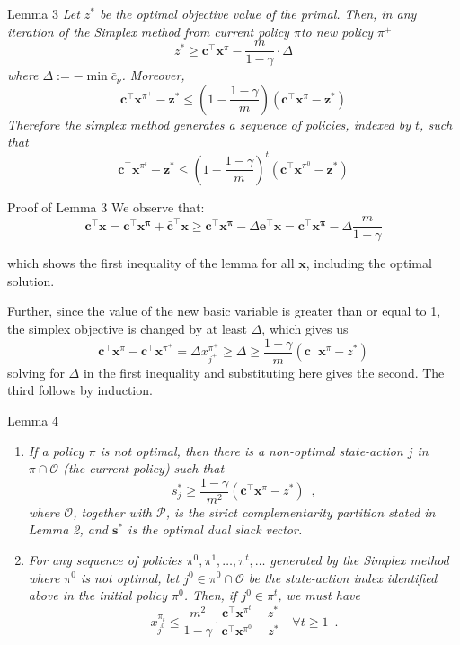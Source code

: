 \documentclass{beamer}
\renewcommand{\vec}[1]{\mathbf{#1}}
\begin{document}
\begin{frame}{Lemma 3}
\emph{Let $z^{\ast}$ be the optimal objective value of the primal. Then, in any iteration of the Simplex method from current policy $\pi$to new policy $\pi^+$
$$z^{\ast} \geq \vec{c}^\top \vec{x}^\pi - \frac{m}{1 - \gamma} \cdot \Delta$$
where $\Delta := - \min \bar{c}_{\nu}$. 
Moreover,
$$
\vec{c}^\top\vec{x}^{\pi^+}−\vec{z}^{\ast} 
  \leq 
  \left( 
    1 − \frac{1-\gamma}{m}
  \right ) 
  \left(\vec{c}^\top\vec{x}^{\pi} − \vec{z}^{\ast}\right)
$$
Therefore the simplex method generates a sequence of policies, indexed by $t$, such that
$$
\vec{c}^\top\vec{x}^{\pi^{t}}−\vec{z}^{\ast} 
  \leq 
  \left( 
    1 − \frac{1-\gamma}{m}
  \right )^t
  \left(\vec{c}^\top\vec{x}^{\pi^{0}} − \vec{z}^{\ast}\right)
$$
}
\end{frame}
\begin{frame}{Proof of Lemma 3}
We observe that:
$$\vec{c}^\top\vec{x} = \vec{c}^\top\vec{x^\pi} + \bar{\vec{c}}^\top\vec{x} \geq \vec{c}^\top\vec{x^\pi} - \Delta \vec{e}^\top \vec{x} =  \vec{c}^\top\vec{x^\pi} - \Delta \frac{m}{1-\gamma}$$

which shows the first inequality of the lemma for all $\vec{x}$, including the optimal solution.

Further, since the value of the new basic variable is greater than or equal to 1, the simplex objective is changed by at least $\Delta$, which gives us
$$\vec{c}^\top \vec{x}^\pi - \vec{c}^\top \vec{x}^{\pi^+} = \Delta x_{j^+}^{\pi^+} \geq \Delta \geq \frac{1-\gamma}{m}\left(
\vec{c}^\top \vec{x}^{\pi} - z^{\ast}\right)$$
solving for $\Delta$ in the first inequality and substituting here gives the second. The third follows by induction.
\end{frame}
\begin{frame}{Lemma 4}
\begin{enumerate}[<+->]
\item \emph{ 
If a policy $\pi$ is not optimal, then there is a non-optimal state-action $j$ in $\pi\cap\mathcal{O}$ (the current policy) such that
$$s_j^*\geq \frac{1-\gamma}{m^2}\left(\vec{c}^\top\vec{x}^\pi-z^*\right)\enspace,$$
where $\mathcal{O}$, together with $\mathcal{P}$, is the strict complementarity partition stated in Lemma 2, and $\vec{s}^*$ is the optimal dual slack vector.
}
\item\emph{
For any sequence of policies $\pi^0,\pi^1,\dots,\pi^t,\dots$ generated by the Simplex method where $\pi^0$ is not optimal, let $j^0\in\pi^0\cap\mathcal{O}$ be the state-action index identified above in the initial policy $\pi^0$. Then, if $j^0\in\pi^t$, we must have
$$x_{j^0}^{\pi_t}\leq\frac{m^2}{1-\gamma}\cdot\frac{\vec{c}^\top\vec{x}^{\pi^t}-z^*}{\vec{c}^\top\vec{x}^{\pi^0}-z^*}\quad\forall t\geq1\enspace.$$
}
\end{enumerate}
\end{frame}
\end{document}
